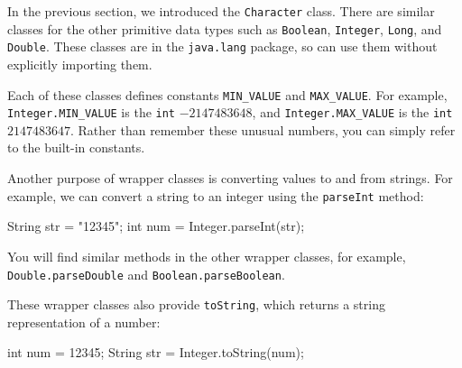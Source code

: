 \documentclass[12pt]{book}
\theoremstyle{exercise}
\newcommand{\java}[1]{\verb"#1"}
\newcommand{\java}[1]{\lstinline{#1}} %
\begin{document}
In the previous section, we introduced the \java{Character} class.
There are similar classes for the other primitive data types such as \java{Boolean}, \java{Integer}, \java{Long}, and \java{Double}.
These classes are in the \java{java.lang} package, so can use them without explicitly importing them.

Each of these classes defines constants \java{MIN_VALUE} and \java{MAX_VALUE}.
For example, \java{Integer.MIN_VALUE} is the \java{int} $-2147483648$, and \java{Integer.MAX_VALUE} is the \java{int} $2147483647$.
Rather than remember these unusual numbers, you can simply refer to the built-in constants.

Another purpose of wrapper classes is converting values to and from strings.
For example, we can convert a string to an integer using the \java{parseInt} method:

\begin{code}
String str = "12345";
int num = Integer.parseInt(str);
\end{code}

You will find similar methods in the other wrapper classes, for example, \java{Double.parseDouble} and \java{Boolean.parseBoolean}.

These wrapper classes also provide \java{toString}, which returns a string representation of a number:

\begin{code}
int num = 12345;
String str = Integer.toString(num);
\end{code}





\end{document}
